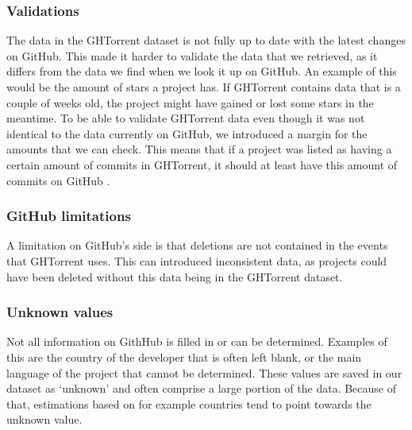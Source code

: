 \subsubsection{Validations}
The data in the GHTorrent dataset is not fully up to date with the latest changes on GitHub.
This made it harder to validate the data that we retrieved, as it differs from the data we find when we look it up on GitHub.
An example of this would be the amount of stars a project has.
If GHTorrent contains data that is a couple of weeks old, the project might have gained or lost some stars in the meantime.
To be able to validate GHTorrent data even though it was not identical to the data currently on GitHub, we introduced a margin for the amounts that we can check.
This means that if a project was listed as having a certain amount of commits in GHTorrent, it should at least have this amount of commits on GitHub . \\

\subsubsection{GitHub limitations}
A limitation on GitHub's side is that deletions are not contained in the events that GHTorrent uses.\cite{gousios-2013}
This can introduced inconsistent data, as projects could have been deleted without this data being in the GHTorrent dataset.\\

\subsubsection{Unknown values}
Not all information on GithHub is filled in or can be determined.
Examples of this are the country of the developer that is often left blank, or the main language of the project that cannot be determined.
These values are saved in our dataset as `unknown' and often comprise a large portion of the data.
Because of that, estimations based on for example countries tend to point towards the unknown value.